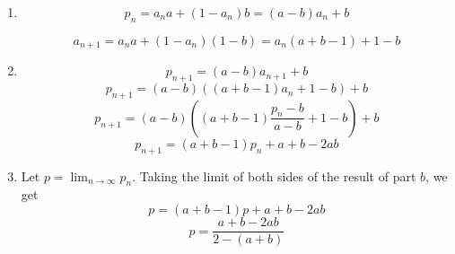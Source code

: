 \begin{enumerate}[label=(\alph*)]
\item 
$$p_{n} = a_{n}a + (1-a_{n})b = (a - b)a_{n} + b$$

$$a_{n+1} = a_{n}a + (1-a_{n})(1-b) = a_{n}(a + b - 1) + 1 - b$$

\item $$p_{n+1} = (a-b)a_{n+1} + b$$
$$p_{n+1} = (a-b)((a + b - 1)a_{n} + 1 - b) + b$$
$$p_{n+1} = (a-b)\left((a + b - 1)\frac{p_{n} - b}{a - b} + 1 - b\right) + b$$
$$p_{n+1} = (a + b - 1)p_{n} + a + b - 2ab$$

\item Let $p = \lim_{n \to \infty} p_{n}$. Taking the limit of both sides of the result of part $b$, we get 
$$p = (a + b - 1)p + a + b - 2ab$$
$$p = \frac{a + b - 2ab}{2 - (a + b)}$$
\end{enumerate}

